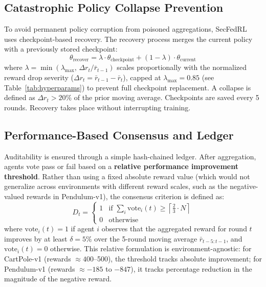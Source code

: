 \documentclass[12pt,a4paper]{article}
\begin{document}
\subsection{Catastrophic Policy Collapse Prevention}

To avoid permanent policy corruption from poisoned aggregations, SecFedRL uses
checkpoint-based recovery. The recovery process merges the current policy with a
previously stored checkpoint:
\begin{equation}
  \theta_{\text{recover}} = \lambda \cdot \theta_{\text{checkpoint}}
    + (1-\lambda)\cdot\theta_{\text{current}}
  \label{eq:recovery}
\end{equation}
where $\lambda = \min(\lambda_{\max},\, \Delta r_t / \bar{r}_{t-1})$ scales
proportionally with the normalized reward drop severity
($\Delta r_t = \bar{r}_{t-1} - \bar{r}_t$), capped at $\lambda_{\max} = 0.85$
(see Table~\ref{tab:hyperparams}) to prevent full checkpoint replacement. A collapse
is defined as $\Delta r_t > 20\%$ of the prior moving average. Checkpoints are saved
every 5 rounds. Recovery takes place without interrupting training.

\subsection{Performance-Based Consensus and Ledger}
\label{sec:perf-consensus}

Auditability is ensured through a simple hash-chained ledger. After aggregation,
agents vote pass or fail based on a \textbf{relative performance improvement
threshold}. Rather than using a fixed absolute reward value (which would not generalize
across environments with different reward scales, such as the negative-valued rewards
in Pendulum-v1), the consensus criterion is defined as:
\begin{equation}
  D_t = \begin{cases}
    1 & \text{if } \displaystyle\sum_i \mathrm{vote}_i(t)
        \geq \left\lceil\tfrac{2}{3}\cdot N\right\rceil \\[4pt]
    0 & \text{otherwise}
  \end{cases}
  \label{eq:consensus}
\end{equation}
where $\mathrm{vote}_i(t) = 1$ if agent $i$ observes that the aggregated reward for
round $t$ improves by at least $\delta = 5\%$ over the 5-round moving average
$\bar{r}_{t-5:t-1}$, and $\mathrm{vote}_i(t) = 0$ otherwise. This relative
formulation is environment-agnostic: for CartPole-v1 (rewards $\approx 400$--500), the
threshold tracks absolute improvement; for Pendulum-v1 (rewards $\approx -185$ to
$-847$), it tracks percentage reduction in the magnitude of the negative reward.
\end{document}

